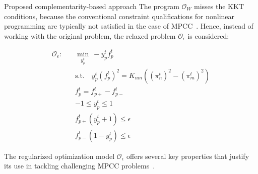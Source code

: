 \documentclass[hyperref={colorlinks,citecolor=blue,linkcolor=blue,urlcolor=blue}]{beamer}
\begin{document}
\begin{frame}{Proposed complementarity-based approach}
   The program $\mathcal{O}_W$ misses the KKT conditions, because the conventional constraint qualifications for nonlinear programming are typically not satisfied in the case of MPCC~\cite{Bouza_Still_2007}. Hence, instead of working with the original problem, the relaxed problem $\mathcal{O}_\epsilon$ is considered:


\begin{subequations}
\begin{align}
\mathcal{O}_\epsilon: \quad &\min\limits_{y_p^t} \ -y_p^t f_p^t \label{eq:complementarity_relaxec1} \\
&\text{s.t.} \quad y_p^t (f_p^t)^2 = K_{nm} \left( (\pi_n^t)^2 - (\pi_m^t)^2 \right) \\
&f_p^t = f_{p+}^t - f_{p-}^t \\
&-1 \leq y_p^t \leq 1 \\
&f_{p+}^t (y_p^t + 1) \leq \epsilon \label{eq:Oe:complementarity1} \\
&f_{p-}^t (1 - y_p^t) \leq \epsilon \label{eq:Oe:complementarity2}
\end{align}
\end{subequations}

The regularized optimization model $\mathcal{O}_{\epsilon}$ offers several key properties that justify its use in tackling challenging MPCC problems~\cite{Ralph_Wright_2004}.
\end{frame}
\end{document}

